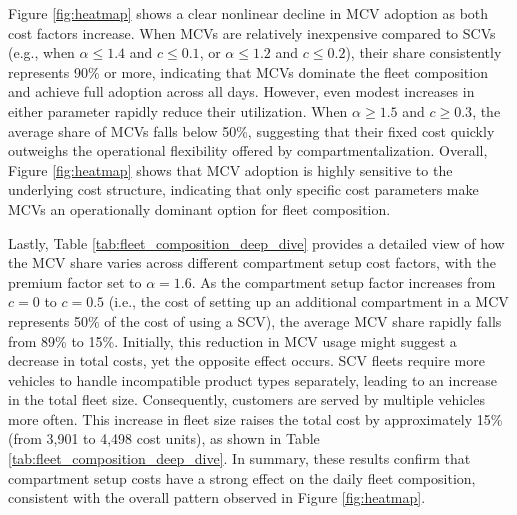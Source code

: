 \documentclass[11pt]{elsarticle}
\theoremstyle{plain}
\begin{document}
Figure \ref{fig:heatmap} shows a clear nonlinear decline in \ac{MCV} adoption as both cost factors increase. When \acp{MCV} are relatively inexpensive compared to \acp{SCV} (e.g., when $\alpha \leq 1.4$ and $c \leq 0.1$, or $\alpha \leq 1.2$ and $c \leq 0.2$), their share consistently represents 90\% or more, indicating that \acp{MCV} dominate the fleet composition and achieve full adoption across all days. However, even modest increases in either parameter rapidly reduce their utilization. When $\alpha \geq 1.5$ and $c \geq 0.3$, the average share of \acp{MCV} falls below 50\%, suggesting that their fixed cost quickly outweighs the operational flexibility offered by compartmentalization. Overall, Figure \ref{fig:heatmap} shows that \ac{MCV} adoption is highly sensitive to the underlying cost structure, indicating that only specific cost parameters make \acp{MCV} an operationally dominant option for fleet composition.

Lastly, Table \ref{tab:fleet_composition_deep_dive} provides a detailed view of how the \ac{MCV} share varies across different compartment setup cost factors, with the premium factor set to $\alpha = 1.6$. As the compartment setup factor increases from $c = 0$ to $c = 0.5$ (i.e., the cost of setting up an additional compartment in a \ac{MCV} represents 50\% of the cost of using a \ac{SCV}), the average \ac{MCV} share rapidly falls from 89\% to 15\%. Initially, this reduction in \ac{MCV} usage might suggest a decrease in total costs, yet the opposite effect occurs. \ac{SCV} fleets require more vehicles to handle incompatible product types separately, leading to an increase in the total fleet size. Consequently, customers are served by multiple vehicles more often. This increase in fleet size raises the total cost by approximately 15\% (from 3,901 to 4,498 cost units), as shown in Table \ref{tab:fleet_composition_deep_dive}.
In summary, these results confirm that compartment setup costs have a strong effect on the daily fleet composition, consistent with the overall pattern observed in Figure \ref{fig:heatmap}.

\begin{table}[htbp]
  \centering
  \caption{Impacts of cost structure when $\alpha = 1.6$. Results averaged over 70 instances.}
  \label{tab:fleet_composition_deep_dive}%
\end{table}%
\end{document}
